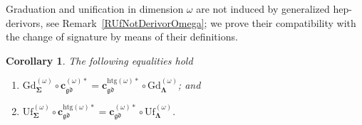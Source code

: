 \documentclass[a4paper, reqno]{amsbook}
\newcommand{\sig}[1]{\mathbf{#1}}             %
\newcommand{\gd}{\mathfrak{gd}}              %
\newcommand{\htg}{\mathrm{htg}}                %
\newcommand{\Gd}{\mathrm{Gd}}
\newcommand{\Uf}{\mathrm{Uf}}
\theoremstyle{plain}
\newtheorem{corollary}[theorem]{Corollary}
\theoremstyle{definition}
\begin{document}
Graduation and unification in dimension $\omega$ are not induced by generalized hep-derivors, see Remark~\ref{RUfNotDerivorOmega}; we prove their compatibility with the change of signature by means of their definitions.

\begin{corollary}\label{CChangeSigGdUfOmega}
The following equalities hold
\begin{enumerate}
	\item
	$\Gd^{(\omega)}_{\sig{\Sigma}}\circ\mathbf{c}^{(\omega)\ast}_{\gd}=\mathbf{c}^{\htg(\omega)\ast}_{\gd}\circ\Gd^{(\omega)}_{\sig{\Lambda}}$; and

	\item
	$\Uf^{(\omega)}_{\sig{\Sigma}}\circ\mathbf{c}^{\htg(\omega)\ast}_{\gd}=\mathbf{c}^{(\omega)\ast}_{\gd}\circ\Uf^{(\omega)}_{\sig{\Lambda}}$.
\end{enumerate}
\end{corollary}
\end{document}
